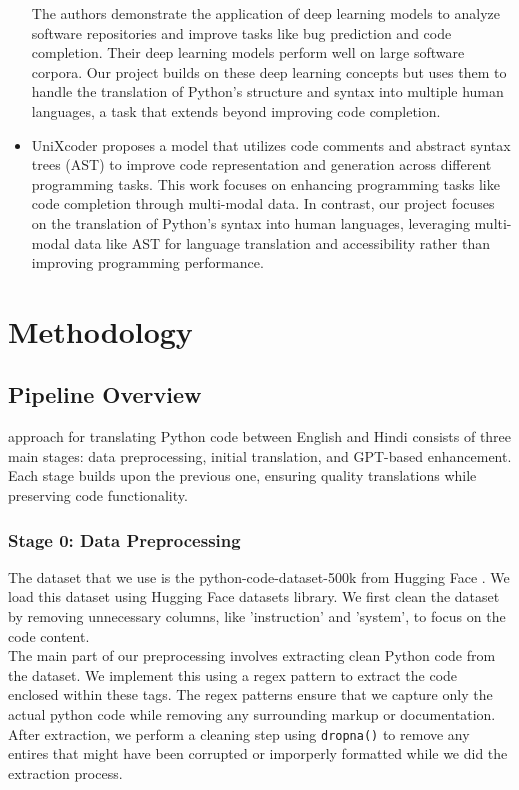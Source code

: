 \documentclass[11pt,a4paper]{article}
\begin{document}
\begin{itemize}
  The authors demonstrate the application of deep learning models to analyze software repositories and improve tasks like bug prediction and code completion. Their deep learning models perform well on large software corpora. Our project builds on these deep learning concepts but uses them to handle the translation of Python's structure and syntax into multiple human languages, a task that extends beyond improving code completion. 
  
  \item \cite{10.1109/ASE56229.2023.00076}
  
  UniXcoder proposes a model that utilizes code comments and abstract syntax trees (AST) to improve code representation and generation across different programming tasks. This work focuses on enhancing programming tasks like code completion through multi-modal data. In contrast, our project focuses on the translation of Python's syntax into human languages, leveraging multi-modal data like AST for language translation and accessibility rather than improving programming performance. 
\end{itemize}

\section {Methodology}
\subsection{Pipeline Overview}
approach for translating Python code between English and Hindi consists of three main stages: data preprocessing, initial translation, and GPT-based enhancement. Each stage builds upon the previous one, ensuring quality translations while preserving code functionality.
\subsubsection{Stage 0: Data Preprocessing}
The dataset that we use is the python-code-dataset-500k from Hugging Face \cite{jtatman2021python}. We load this dataset using Hugging Face datasets library. We first clean the dataset by removing unnecessary columns, like 'instruction' and 'system', to focus on the code content.\\ 

The main part of our preprocessing involves extracting clean Python code from the dataset. We implement this using a regex pattern to extract the code enclosed within these tags. The regex patterns ensure that we capture only the actual python code while removing any surrounding markup or documentation. After extraction, we perform a cleaning step using \texttt{dropna()} to remove any entires that might have been corrupted or imporperly formatted while we did the extraction process.\\ 
\end{document}
